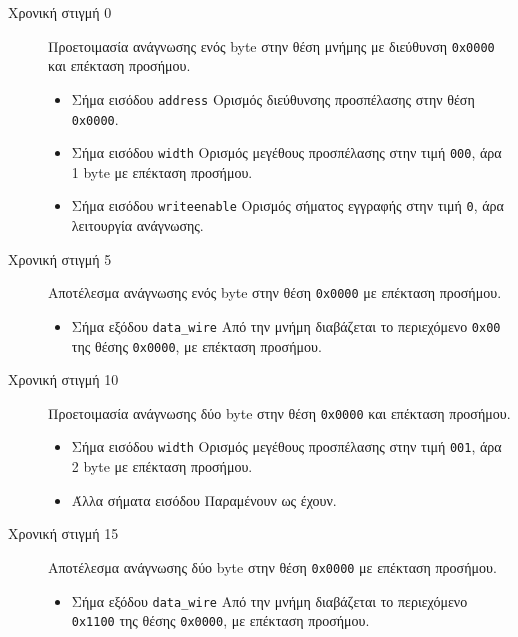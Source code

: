 \documentclass[11pt]{extarticle}
\begin{document}
\begin{description}
\item[Χρονική στιγμή 0] \hfill \newline 
Προετοιμασία ανάγνωσης ενός byte στην θέση μνήμης με διεύθυνση \texttt{0x0000} και επέκταση προσήμου.
\begin{itemize}
    \item Σήμα εισόδου \texttt{address} \newline Ορισμός διεύθυνσης προσπέλασης στην θέση \texttt{0x0000}.
    \item Σήμα εισόδου \texttt{width} \newline Ορισμός μεγέθους προσπέλασης στην τιμή \texttt{000}, άρα 1 byte με επέκταση προσήμου.
    \item Σήμα εισόδου \texttt{write\textunderscore enable} \newline Ορισμός σήματος εγγραφής στην τιμή \texttt{0}, άρα λειτουργία ανάγνωσης.
\end{itemize}
\item[Χρονική στιγμή 5]\hfill \newline 
Αποτέλεσμα ανάγνωσης ενός byte στην θέση \texttt{0x0000} με επέκταση προσήμου.
\begin{itemize}
    \item Σήμα εξόδου \texttt{data\_wire} \newline Από την μνήμη διαβάζεται το περιεχόμενο \texttt{0x00} της θέσης \texttt{0x0000}, με επέκταση προσήμου.
\end{itemize}
\item[Χρονική στιγμή 10] \hfill \newline
Προετοιμασία ανάγνωσης δύο byte στην θέση \texttt{0x0000} και επέκταση προσήμου.
\begin{itemize}
    \item Σήμα εισόδου \texttt{width} \newline Ορισμός μεγέθους προσπέλασης στην τιμή \texttt{001}, άρα 2 byte με επέκταση προσήμου.
    \item Άλλα σήματα εισόδου \newline Παραμένουν ως έχουν.
\end{itemize}
\newpage
\item[Χρονική στιγμή 15] \hfill \newline
Αποτέλεσμα ανάγνωσης δύο byte στην θέση \texttt{0x0000} με επέκταση προσήμου.
\begin{itemize}
    \item Σήμα εξόδου \texttt{data\_wire} \newline Από την μνήμη διαβάζεται το περιεχόμενο \texttt{0x1100} της θέσης \texttt{0x0000}, με επέκταση προσήμου.

\end{itemize}
\end{description}
\end{document}
